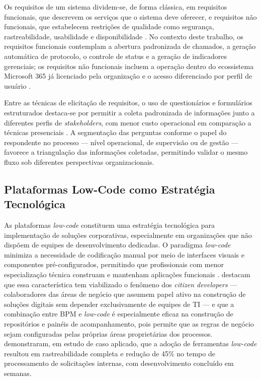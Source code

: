 Os requisitos de um sistema dividem-se, de forma clássica, em
requisitos funcionais, que descrevem os serviços que o
sistema deve oferecer, e requisitos não funcionais, que
estabelecem restrições de qualidade como segurança,
rastreabilidade, usabilidade e disponibilidade
\cite{Alves2022}. No contexto deste trabalho, os requisitos
funcionais contemplam a abertura padronizada de chamados, a
geração automática de protocolo, o controle de status e a
geração de indicadores gerenciais; os requisitos não
funcionais incluem a operação dentro do ecossistema Microsoft
365 já licenciado pela organização e o acesso diferenciado por
perfil de usuário \cite{Lopes2024}.

Entre as técnicas de elicitação de requisitos, o uso de
questionários e formulários estruturados destaca-se por
permitir a coleta padronizada de informações junto a
diferentes perfis de \textit{stakeholders}, com menor custo
operacional em comparação a técnicas presenciais
\cite{Gil2002}. A segmentação das perguntas conforme o papel
do respondente no processo --- nível operacional, de
supervisão ou de gestão --- favorece a triangulação das
informações coletadas, permitindo validar o mesmo fluxo sob
diferentes perspectivas organizacionais.

\subsection{Plataformas Low-Code como Estratégia Tecnológica}

As plataformas \textit{low-code} constituem uma estratégia
tecnológica para implementação de soluções corporativas,
especialmente em organizações que não dispõem de equipes de
desenvolvimento dedicadas. O paradigma \textit{low-code}
minimiza a necessidade de codificação manual por meio de
interfaces visuais e componentes pré-configurados, permitindo
que profissionais com menor especialização técnica construam
e mantenham aplicações funcionais \cite{Alves2022}.
\cite{Santos2023} destacam que essa característica tem
viabilizado o fenômeno dos \textit{citizen developers} ---
colaboradores das áreas de negócio que assumem papel ativo na
construção de soluções digitais sem depender exclusivamente
de equipes de TI --- e que a combinação entre BPM e
\textit{low-code} é especialmente eficaz na construção de
repositórios e painéis de acompanhamento, pois permite que as
regras de negócio sejam configuradas pelas próprias áreas
proprietárias dos processos. \cite{Costa2022} demonstraram,
em estudo de caso aplicado, que a adoção de ferramentas
\textit{low-code} resultou em rastreabilidade completa e
redução de 45\% no tempo de processamento de solicitações
internas, com desenvolvimento concluído em semanas.

